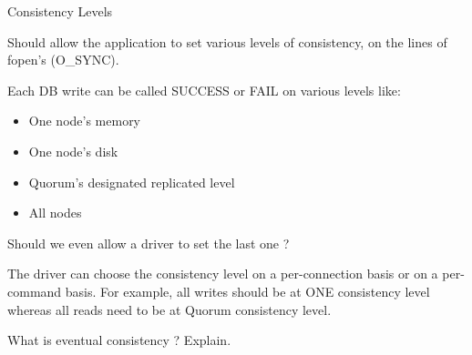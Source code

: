 Consistency Levels

Should allow the application to set various levels of consistency, on the lines of fopen's (O_SYNC).

Each DB write can be called SUCCESS or FAIL on various levels like:

\begin{itemize}
\item One node's memory
\end{itemize}
\begin{itemize}
\item One node's disk
\end{itemize}
\begin{itemize}
\item Quorum's designated replicated level
\end{itemize}
\begin{itemize}
\item All nodes
\end{itemize}

Should we even allow a driver to set the last one ?

The driver can choose the consistency level on a per-connection basis or on a per-command basis. For example, all writes should be at ONE consistency level whereas all reads need to be at Quorum consistency level.

What is eventual consistency ? Explain.
